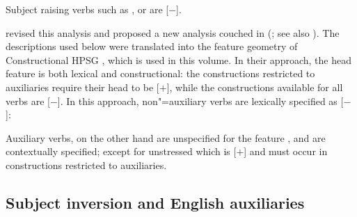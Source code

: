 \noindent
Subject raising verbs such as ,  or  are [\aux $-$].

\citet{Sagetal2020} revised this analysis and proposed a new analysis couched in \sbcg (\citealp{Sag2012a}; see also ). The descriptions used below were translated into the feature geometry of Constructional HPSG \citep{Sag97a}, which is used in this volume. In their approach, the head feature \aux is both lexical and constructional: the constructions restricted to auxiliaries require their head to be [\aux $+$], while the constructions available for all verbs are [\aux $-$]. In this approach, non"=auxiliary verbs are lexically specified as [\aux $-$]:

\begin{exe}
\ex {} \impl
{}
\end{exe}

 Auxiliary verbs, on the other hand are unspecified for the feature \aux, and are contextually specified; except for unstressed   which is [\aux $+$] and must occur in constructions restricted to auxiliaries.

\eal
\settowidth{}
 \label{inv1}
\label{inv2}
\zl

\subsection{Subject inversion and English auxiliaries}

